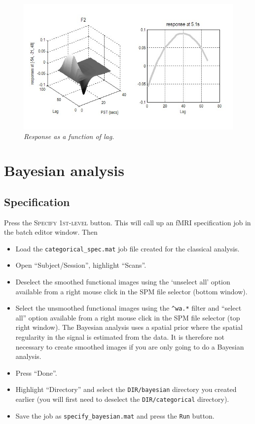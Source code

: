 \begin{figure}
\begin{center}
\includegraphics[width=150mm]{faces/famous_lag}
\caption{\em Response as a function of lag. \label{famous_lag} }
\end{center}
\end{figure}


\section{Bayesian analysis}

\subsection{Specification}

Press the \textsc{Specify 1st-level} button. This will call up an fMRI specification job in the batch editor window. Then

\begin{itemize}
\item Load the \texttt{categorical\_spec.mat} job file created for the classical analysis.
\item Open ``Subject/Session'', highlight ``Scans''.
\item Deselect the smoothed functional images using the `unselect all' option available from a right mouse click in the SPM file selector (bottom window).
\item Select the unsmoothed functional images using the \texttt{\textasciicircum wa.*} filter and ``select all'' option available from a right mouse click in the SPM file selector (top right window). The Bayesian analysis uses a spatial prior where the spatial regularity in the signal is estimated from the data. It is therefore not necessary to create smoothed images if you are only going to do a Bayesian analysis.
\item Press ``Done''.
\item Highlight ``Directory'' and select the \texttt{DIR/bayesian} directory you created earlier (you will first need to deselect the \texttt{DIR/categorical} directory).
\item Save the job as \texttt{specify\_bayesian.mat} and press the \texttt{Run} button.
\end{itemize}

